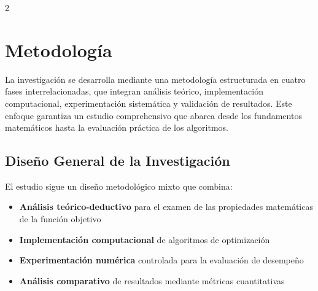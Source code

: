 \documentclass[11pt, a4paper, twocolumn]{beamer}
\begin{document}
\begin{multicols}{2}
	\section{Metodología}
		
		La investigación se desarrolla mediante una metodología estructurada en cuatro fases interrelacionadas, que integran análisis teórico, implementación computacional, experimentación sistemática y validación de resultados. Este enfoque garantiza un estudio comprehensivo que abarca desde los fundamentos matemáticos hasta la evaluación práctica de los algoritmos.
		
		\subsection{Diseño General de la Investigación}
		
		El estudio sigue un diseño metodológico mixto que combina:
		
		\begin{itemize}
			\item \textbf{Análisis teórico-deductivo} para el examen de las propiedades matemáticas de la función objetivo
			\item \textbf{Implementación computacional} de algoritmos de optimización
			\item \textbf{Experimentación numérica} controlada para la evaluación de desempeño
			\item \textbf{Análisis comparativo} de resultados mediante métricas cuantitativas
		\end{itemize}
	\end{multicols}
	\newpage
	
\end{document}
